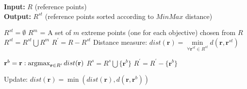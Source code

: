 \documentclass[review]{elsarticle}
\begin{document}
\begin{algorithm}[!h]
	
	\textbf{Input:} $R$ (reference points)\\
	\textbf{Output:} $R^{st}$ (reference points sorted according to $MinMax$ distance)
	
	\begin{algorithmic}[1]
		
		\STATE $R^{st} = \emptyset$
		\STATE $R^m$ = A set of $m$ extreme points (one for each objective) chosen from $R$ 
		\STATE $R^{st} = R^{st} \bigcup R^m$
		\STATE ${R}^\prime = R-R^{st}$
		\STATE Distance measure: $dist(\mathbf{r})=\displaystyle\min\limits_{\forall \mathbf{r}^{st} \in R^{st}}{d(\mathbf{r}, \mathbf{r}^{st})}$
		\ENDFOR
		
		\STATE $\mathbf{r}^b =\mathbf{r}:\argmax_{\mathbf{r}\in R^\prime} dist(\mathbf{r})$
		\STATE $R^s=R^s \bigcup \{\mathbf{r}^b\}$
		\STATE ${R}^\prime = {R}^\prime-\{\mathbf{r}^b\}$	
		
		\STATE Update: $dist(\mathbf{r})=\displaystyle\min{(dist(\mathbf{r}),d(\mathbf{r},\mathbf{r}^b))}$
		\ENDFOR
		
		\ENDWHILE	
		
	\end{algorithmic}
	\caption{$MinMax(R)$}
	
	\label{alg:MinMaxAlgo}
\end{algorithm}



%	
%	
%		
%	
\end{document}
